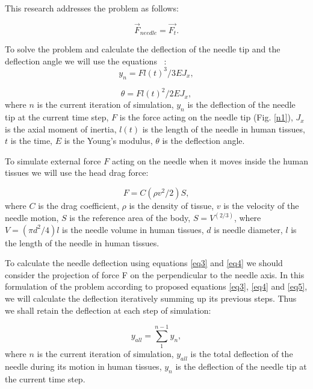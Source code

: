 \documentclass[a4paper]{jpconf}
\begin{document}
This research addresses the problem as follows:

\begin{equation} \label{eq2}
\vec{F}_{needle} = \vec{F_{t}}.
\end{equation}

To solve the problem and calculate the deflection of the needle tip and the deflection angle we will use the equations ~\cite{Model}:
\begin{equation} \label{eq3}
y_{n} = Fl(t)^3 / 3EJ_{x},
\end{equation}

\begin{equation} \label{eq4}
\theta = Fl(t)^2 / 2EJ_{x},
\end{equation}
where  $n$ is the current iteration of simulation, $y_{n}$ is the deflection of the needle tip at the current time step,
$F$  is the force acting on the needle tip (Fig.  \ref{n1}), $J_{x}$  is the axial moment of inertia, 
$l(t)$  is the length of the needle in human tissues, $t$  is the time, $E$  is the Young's modulus, $\theta$  is the deflection angle.

To simulate external force $F$ acting on the needle when it moves inside the human tissues we will use the head drag force:

\begin{equation} \label{eq5}
F = C (\rho v^2/2) S, 
\end{equation}
where  $C$  is the drag coefficient, $\rho$  is the density of tissue, $v$  is the velocity of the needle motion, $S$  is the reference area of the body, $S = V^{(2/3)}$, where $V = (\pi d^2/4)l$ is the needle volume  in human tissues, $d$ is needle diameter, $l$ is the length of the needle in human tissues.

To calculate the needle deflection using equations \eqref{eq3} and \eqref{eq4} we should consider the projection of force F on the perpendicular to the needle axis. In this formulation of the problem according to proposed equations \eqref{eq3}, \eqref{eq4} and \eqref{eq5}, we will calculate the deflection iteratively summing up its previous steps. Thus we shall retain the deflection at each step of simulation:

\begin{equation} \label{eq6}
y_{all} = \sum\limits_{1}^{n-1} y_{n},
\end{equation}
where $n$  is the current iteration of simulation, $y_{all}$  is the total deflection of the needle during its motion in human tissues, $y_{n}$  is the deflection of the needle tip at the current time step.
\end{document}
